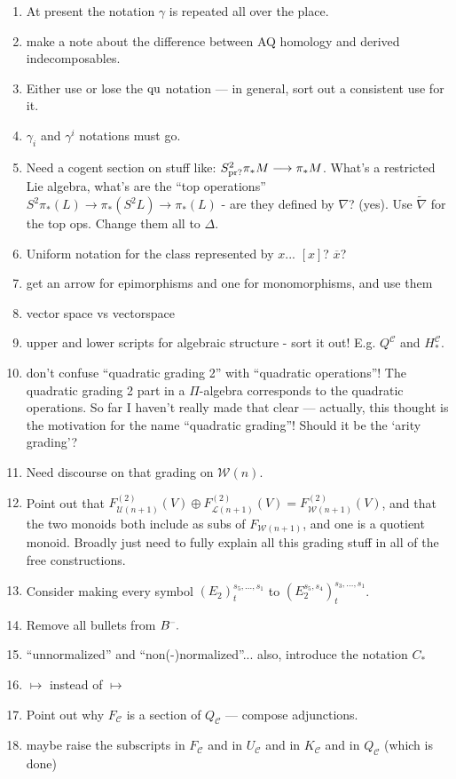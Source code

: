 \documentclass[11pt]{amsart}
\theoremstyle{plain}
\theoremstyle{definition}
\newcommand{\DASH}{\textup{--}}
\renewcommand{\to}{\longrightarrow}
\newcommand{\calW}{\mathcal{W}}
\newcommand{\calU}{\mathcal{U}}
\newcommand{\calL}{\mathcal{L}}
\newcommand{\calC}{\mathcal{C}}
\theoremstyle{plain}
\newcommand{\quadratic}{\textup{qu}}
\begin{document}
\begin{todolist}
\begin{enumerate}
\item At present the notation $\gamma$ is repeated all over the place.
\item make a note about the difference between AQ homology and derived indecomposables.
\item Either use or lose the $\quadratic$ notation --- in general, sort out a consistent use for it.
\item $\gamma_i$ and $\gamma^i$ notations must go.
\item Need a cogent section on stuff like: $S^2_\textup{pr?}\pi_*M\to \pi_*M$. What's a restricted Lie algebra, what's are the ``top operations'' $S^2\pi_*(L)\to \pi_*(S^2L)\to \pi_*(L)$ - are they defined by $\nabla$? (yes). Use $\widetilde{\nabla}$ for the top ops. Change them all to $\Delta$.
\item Uniform notation for the class represented by $x$... $[x]$? $\overline{x}$?
\item get an arrow for epimorphisms and one for monomorphisms, and use them
\item vector space vs vectorspace
\item upper and lower scripts for algebraic structure - sort it out! E.g. $Q^\calC$ and $H_*^\calC$.
\item don't confuse ``quadratic grading 2'' with ``quadratic operations''! The quadratic grading 2 part in a $\Pi$-algebra corresponds to the quadratic operations. So far I haven't really made that clear --- actually, this thought is the motivation for the name ``quadratic grading''! Should it be the `arity grading'?
\item Need discourse on that grading on $\calW(n)$.
\item Point out that $F_{\calU(n+1)}^{(2)}(V)\oplus F_{\calL(n+1)}^{(2)}(V)=F_{\calW(n+1)}^{(2)}(V)$, and that the two monoids both include as subs of $F_{\calW(n+1)}$, and one is a quotient monoid. Broadly just need to fully explain all this grading stuff in all of the free constructions.
\item Consider making every symbol $(E_2)^{s_5,\ldots,s_1}_t$ to $(E_2^{s_5,s_4})^{s_3,\ldots,s_1}_t$.
\item Remove all bullets from $B^{\DASH}.$
\item ``unnormalized'' and ``non(-)normalized''... also, introduce the notation $C_*$
\item $\longmapsto$ instead of $\mapsto$
\item Point out why $F_\calC$ is a section of $Q_{\calC}$ --- compose adjunctions.
\item maybe raise the subscripts in $F_\calC$ and in $U_\calC$ and in $K_\calC$ and in $Q_\calC$ (which is done)

\end{enumerate}
\end{todolist}
\end{document}
